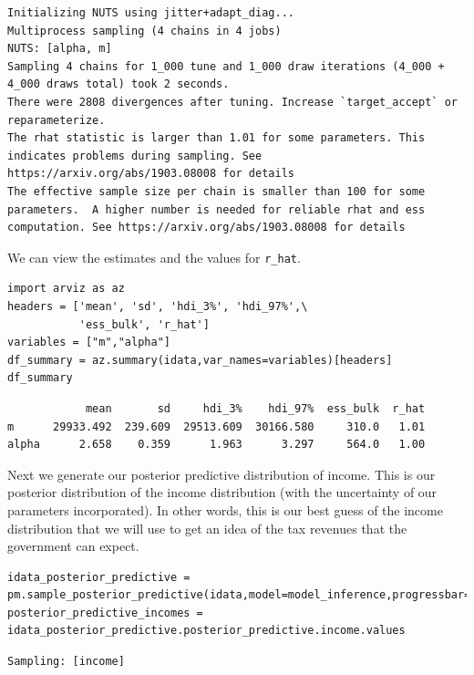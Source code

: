 \documentclass[11pt]{article}
\begin{document}
\label{}
\begin{verbatim}
Initializing NUTS using jitter+adapt_diag...
Multiprocess sampling (4 chains in 4 jobs)
NUTS: [alpha, m]
Sampling 4 chains for 1_000 tune and 1_000 draw iterations (4_000 + 4_000 draws total) took 2 seconds.
There were 2808 divergences after tuning. Increase `target_accept` or reparameterize.
The rhat statistic is larger than 1.01 for some parameters. This indicates problems during sampling. See https://arxiv.org/abs/1903.08008 for details
The effective sample size per chain is smaller than 100 for some parameters.  A higher number is needed for reliable rhat and ess computation. See https://arxiv.org/abs/1903.08008 for details
\end{verbatim}


We can view the estimates and the values for \texttt{r\_hat}.

\begin{verbatim}
import arviz as az
headers = ['mean', 'sd', 'hdi_3%', 'hdi_97%',\
           'ess_bulk', 'r_hat']
variables = ["m","alpha"]
df_summary = az.summary(idata,var_names=variables)[headers]
df_summary
\end{verbatim}

\label{}
\begin{verbatim}
            mean       sd     hdi_3%    hdi_97%  ess_bulk  r_hat
m      29933.492  239.609  29513.609  30166.580     310.0   1.01
alpha      2.658    0.359      1.963      3.297     564.0   1.00
\end{verbatim}



Next we generate our posterior predictive distribution of income. This is our posterior distribution of the income distribution (with the uncertainty of our parameters incorporated). In other words, this is our best guess of the income distribution that we will use to get an idea of the tax revenues that the government can expect.

\begin{verbatim}
idata_posterior_predictive = pm.sample_posterior_predictive(idata,model=model_inference,progressbar=False)
posterior_predictive_incomes = idata_posterior_predictive.posterior_predictive.income.values
\end{verbatim}

\label{}
\begin{verbatim}
Sampling: [income]
\end{verbatim}
\end{document}

